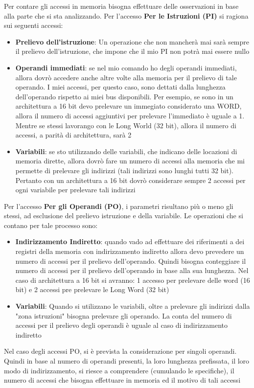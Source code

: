 Per contare gli accessi in memoria bisogna effettuare delle osservazioni in base alla parte che si sta analizzando.
Per l'accesso \textbf{Per le Istruzioni (PI)} si ragiona sui seguenti accessi:
\begin{itemize}
    \item \textbf{Prelievo dell'istruzione}: Un operazione che non mancherà mai sarà sempre il prelievo dell'istruzione, che impone che il mio PI non potrà mai essere nullo
    \item \textbf{Operandi immediati}: se nel mio comando ho degli operandi immediati, allora dovrò accedere anche altre volte alla memoria per il prelievo di tale operando. I miei accessi, per questo caso, sono dettati dalla lunghezza dell'operando rispetto ai miei bus disponibili. Per esempio, se sono in un architettura a 16 bit devo prelevare un immegiato considerato una WORD, allora il numero di accessi aggiuntivi per prelevare l'immediato è uguale a 1. Mentre se stessi lavorango con le Long World (32 bit), allora il numero di accessi, a parità di architettura, sarà 2
    \item \textbf{Variabili}: se sto utilizzando delle variabili, che indicano delle locazioni di memoria dirette, allora dovrò fare un numero di accessi alla memoria che mi permette di prelevare gli indirizzi (tali indirizzi sono lunghi tutti 32 bit). Pertanto con un architettura a 16 bit dovrò considerare sempre 2 accessi per ogni variabile per prelevare tali indirizzi
\end{itemize}

Per l'accesso \textbf{Per gli Operandi (PO)}, i parametri risultano più o meno gli stessi, ad esclusione del prelievo istruzione e della variabile. Le operazioni che si contano per tale processo sono:
\begin{itemize}
    \item \textbf{Indirizzamento Indiretto}: quando vado ad effettuare dei riferimenti a dei registri della memoria con indirizzamento indiretto allora devo prevedere un numero di accessi per il prelievo dell'operando. Quindi bisogna conteggiare il numero di accessi per il prelievo dell'operando in base alla sua lunghezza. Nel caso di architettura a 16 bit si avranno: 1 accesso per prelevare delle word (16 bit) e 2 accessi pre prelevare le Long Word (32 bit)
    
    \item \textbf{Variabili}: Quando si utilizzano le variabili, oltre a prelevare gli indirizzi dalla "zona istruzioni" bisogna prelevare gli operando. La conta del numero di accessi per il prelievo degli operandi è uguale al caso di indirizzamento indiretto
\end{itemize}

Nel caso degli accessi PO, si è prevista la considerazione per singoli operandi. Quindi in base al numero di operandi presenti, la loro lunghezza prefissata, il loro modo di indirizzamento, si riesce a comprendere (cumulando le specifiche), il numero di accessi che bisogna effettuare in memoria ed il motivo di tali accessi

